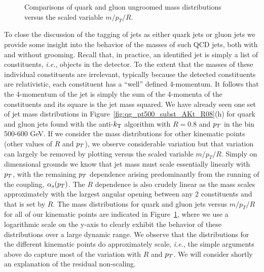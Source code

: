 \begin{figure}
\centering
{}
\caption{Comparisons of quark and gluon ungroomed mass distributions versus the scaled variable $m/p_T/R$. }
\label{fig:qg_masses_log}
\end{figure}

To close the discussion of the tagging of jets as either quark jets or gluon jets we provide some insight into the behavior of the masses of such QCD jets,
both with and without grooming.  Recall that, in practice, an identified jet is simply a list of constituents, \textit{i.e.}, objects in the detector.  To the extent
that the masses of these individual constituents are irrelevant, typically because the detected constituents are relativistic, each constituent has a ``well''
defined 4-momentum.  It follows that the 4-momentum of the jet  is simply the sum of the 4-momenta of the constituents and its square is the jet mass squared.
We have already seen one set of jet mass distributions in  Figure~\ref{fig:qg_pt500_subst_AKt_R08}(h) for quark and gluon jets found with the anti-$k_{\mathrm{T}}$
algorithm with  $R = 0.8$ and $p_T$ in the bin 500-600 GeV.  If we consider the mass distributions for other kinematic points (other values of $R$ and $p_T$),
we observe considerable variation but that variation can largely be removed by plotting versus the scaled variable $m/p_T/R$.  Simply on dimensional grounds
we know that jet mass must scale essentially linearly with $p_T$, with the remaining $p_T$ dependence arising predominantly from the running of the coupling,
$\alpha_s(p_T)$.  The $R$ dependence is also crudely linear as the mass scales approximately with the largest angular opening between any 2 constituents
and that is set by $R$.  The mass distributions for quark and gluon jets versus $m/p_T/R$ for all of our kinematic points 
are indicated in Figure~\ref{fig:qg_masses_log}, where
we use a logarithmic scale on the y-axis to clearly exhibit the behavior of these distributions over a large dynamic range.  We observe that the distributions
for the different kinematic points do approximately scale, \textit{i.e.}, the simple arguments above do capture most of the variation with $R$ and $p_T$.
We will consider shortly an explanation of the residual non-scaling. 

